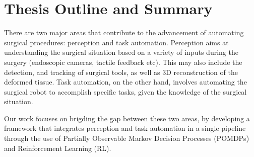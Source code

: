 \chapter*{Thesis Outline and Summary}

There are two major areas that contribute to the advancement of automating surgical procedures: 
perception and task automation. Perception aims at understanding the surgical situation based on 
a variety of inputs during the surgery (endoscopic cameras, tactile feedback etc). This may also include 
the detection, and tracking of surgical tools, as well as 3D reconstruction of the deformed tissue. 
Task automation, on the other hand, involves automating the surgical robot to accomplish specific tasks, 
given the knowledge of the surgical situation. 

Our work focuses on brigding the gap between these two areas, by developing a framework that 
integrates perception and task automation in a single pipeline through the use of Partially Observable 
Markov Decision Processes (POMDPs) and Reinforcement Learning (RL).
